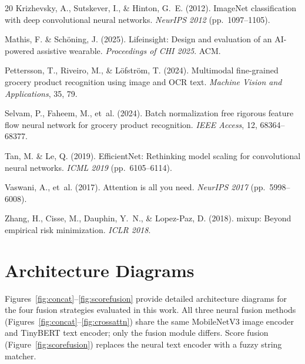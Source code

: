 \documentclass[10pt,twocolumn]{article}
\begin{document}
\begin{thebibliography}{20}
Krizhevsky, A., Sutskever, I., \& Hinton, G.~E. (2012).
\newblock ImageNet classification with deep convolutional neural networks.
\newblock \emph{NeurIPS 2012} (pp.\ 1097--1105).

Mathis, F. \& Sch\"{o}ning, J. (2025).
\newblock Lifeinsight: Design and evaluation of an AI-powered assistive wearable.
\newblock \emph{Proceedings of CHI 2025}. ACM.

Pettersson, T., Riveiro, M., \& L\"{o}fstr\"{o}m, T. (2024).
\newblock Multimodal fine-grained grocery product recognition using image and OCR text.
\newblock \emph{Machine Vision and Applications}, 35, 79.

Selvam, P., Faheem, M., et~al. (2024).
\newblock Batch normalization free rigorous feature flow neural network for grocery product recognition.
\newblock \emph{IEEE Access}, 12, 68364--68377.

Tan, M. \& Le, Q. (2019).
\newblock EfficientNet: Rethinking model scaling for convolutional neural networks.
\newblock \emph{ICML 2019} (pp.\ 6105--6114).

Vaswani, A., et~al. (2017).
\newblock Attention is all you need.
\newblock \emph{NeurIPS 2017} (pp.\ 5998--6008).

Zhang, H., Cisse, M., Dauphin, Y.~N., \& Lopez-Paz, D. (2018).
\newblock mixup: Beyond empirical risk minimization.
\newblock \emph{ICLR 2018}.

\end{thebibliography}

\appendix
\section{Architecture Diagrams}
\label{sec:appendix}

Figures~\ref{fig:concat}--\ref{fig:scorefusion} provide detailed architecture diagrams for the four fusion strategies evaluated in this work. All three neural fusion methods (Figures~\ref{fig:concat}--\ref{fig:crossattn}) share the same MobileNetV3 image encoder and TinyBERT text encoder; only the fusion module differs. Score fusion (Figure~\ref{fig:scorefusion}) replaces the neural text encoder with a fuzzy string matcher.
\end{document}
